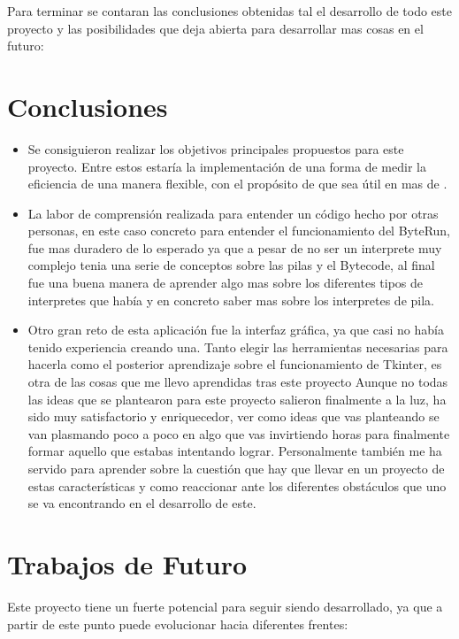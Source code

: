 
Para terminar se contaran las conclusiones obtenidas tal el desarrollo de todo este proyecto y las posibilidades que deja abierta para desarrollar mas cosas en el futuro:
\section{Conclusiones}
\begin{itemize}
	\item Se consiguieron realizar los objetivos principales propuestos para este proyecto. Entre estos estaría la implementación de una forma de medir la eficiencia de una manera flexible, con el propósito de que sea útil en mas de .
	\item La labor de comprensión realizada para entender un código hecho por otras personas, en este caso concreto para entender el funcionamiento del ByteRun, fue mas duradero de lo esperado ya que a pesar de no ser un interprete muy complejo tenia una serie de conceptos sobre las pilas y el Bytecode, al final fue una buena manera de aprender algo mas sobre los diferentes tipos de interpretes que había y en concreto saber mas sobre los interpretes de pila.
	\item Otro gran reto de esta aplicación fue la interfaz gráfica, ya que casi no había tenido experiencia creando una. Tanto elegir las herramientas necesarias para hacerla como el posterior aprendizaje sobre el funcionamiento de Tkinter, es otra de las cosas que me llevo aprendidas tras este proyecto
Aunque no todas las ideas que se plantearon para este proyecto salieron finalmente a la luz, ha sido muy satisfactorio y enriquecedor, ver como ideas que vas planteando se van plasmando poco a poco en algo que vas invirtiendo horas para finalmente formar aquello que estabas intentando lograr. Personalmente también me ha servido para aprender sobre la cuestión que hay que llevar en un proyecto de estas características y como reaccionar ante los diferentes obstáculos que uno se va encontrando en el desarrollo de este.
\end{itemize}


\section{Trabajos de Futuro}
Este proyecto tiene un fuerte potencial para seguir siendo desarrollado, ya que a partir de este punto puede evolucionar hacia diferentes frentes:\\


